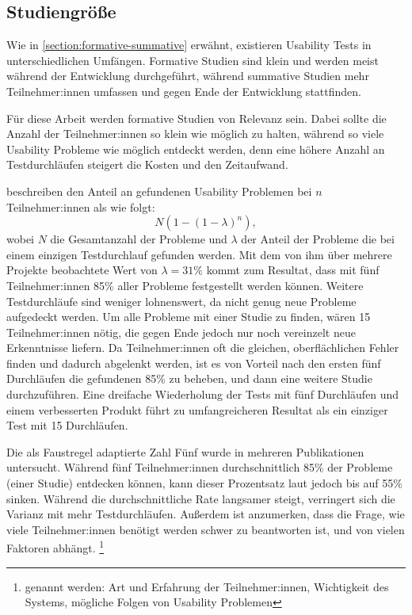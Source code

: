 \subsection{Studiengröße}
\label{section:study-size}

Wie in \ref{section:formative-summative} erwähnt, existieren Usability Tests in unterschiedlichen
Umfängen. Formative Studien sind klein und werden meist während der Entwicklung durchgeführt,
während summative Studien mehr Teilnehmer:innen umfassen und gegen Ende der Entwicklung stattfinden.

Für diese Arbeit werden formative Studien von Relevanz sein. Dabei sollte die Anzahl der
Teilnehmer:innen so klein wie möglich zu halten, während so viele Usability Probleme wie möglich
entdeckt werden, denn eine höhere Anzahl an Testdurchläufen steigert die Kosten und den Zeitaufwand.
\parencites{faulknerFiveuserAssumption2003, nielsenWhyYou2000}

\textcite{nielsenMathematicalModel1993} beschreiben den Anteil an gefundenen Usability Problemen bei
$n$ Teilnehmer:innen als wie folgt:
\begin{equation}
  \label{equation:finding-usability-problems}
  N(1-(1-\lambda{})^n),
\end{equation}
wobei $N$ die Gesamtanzahl der Probleme und $\lambda{}$ der Anteil der Probleme die bei einem
einzigen Testdurchlauf gefunden werden. Mit dem von ihm über mehrere Projekte beobachtete Wert von
$\lambda{}=31\%$ kommt \textcite{nielsenWhyYou2000} zum Resultat, dass mit fünf Teilnehmer:innen
85\% aller Probleme festgestellt werden können. \cite{nielsenWhyYou2000} Weitere Testdurchläufe sind
weniger lohnenswert, da nicht genug neue Probleme aufgedeckt werden. Um alle Probleme mit einer
Studie zu finden, wären 15 Teilnehmer:innen nötig, die gegen Ende jedoch nur noch vereinzelt neue
Erkenntnisse liefern. Da Teilnehmer:innen oft die gleichen, oberflächlichen Fehler finden und
dadurch abgelenkt werden, ist es von Vorteil nach den ersten fünf Durchläufen die gefundenen 85\% zu
beheben, und dann eine weitere Studie durchzuführen. Eine dreifache Wiederholung der Tests mit fünf
Durchläufen und einem verbesserten Produkt führt zu umfangreicheren Resultat als ein einziger Test
mit 15 Durchläufen.
\parencite{nielsenWhyYou2000}

Die als Faustregel adaptierte Zahl Fünf wurde in mehreren Publikationen untersucht. Während fünf
Teilnehmer:innen durchschnittlich 85\% der Probleme (einer Studie) entdecken können, kann dieser
Prozentsatz laut \textcite{faulknerFiveuserAssumption2003} jedoch bis auf 55\% sinken. Während die
durchschnittliche Rate langsamer steigt, verringert sich die Varianz mit mehr Testdurchläufen.
Außerdem ist anzumerken, dass die Frage, wie viele Teilnehmer:innen benötigt werden schwer zu
beantworten ist, und von vielen Faktoren abhängt. \footnote{genannt werden: Art und Erfahrung der
  Teilnehmer:innen, Wichtigkeit des Systems, mögliche Folgen von Usability Problemen}
\parencite{faulknerFiveuserAssumption2003}

